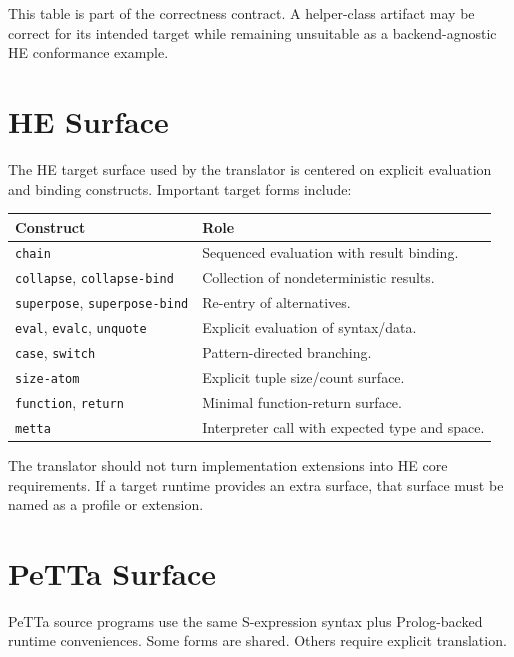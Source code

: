\documentclass[11pt]{article}
\newcommand{\code}[1]{\texttt{#1}}
\newcommand{\HE}{\textup{HE}}
\newcommand{\PeTTa}{\textup{PeTTa}}
\begin{document}
This table is part of the correctness contract.  A helper-class artifact may be
correct for its intended target while remaining unsuitable as a backend-agnostic
\HE{} conformance example.

\section{\HE{} Surface}

The \HE{} target surface used by the translator is centered on explicit
evaluation and binding constructs.  Important target forms include:
\begin{center}
\begin{tabular}{ll}
\toprule
Construct & Role \\
\midrule
\code{chain} & Sequenced evaluation with result binding. \\
\code{collapse}, \code{collapse-bind} & Collection of nondeterministic results. \\
\code{superpose}, \code{superpose-bind} & Re-entry of alternatives. \\
\code{eval}, \code{evalc}, \code{unquote} & Explicit evaluation of syntax/data. \\
\code{case}, \code{switch} & Pattern-directed branching. \\
\code{size-atom} & Explicit tuple size/count surface. \\
\code{function}, \code{return} & Minimal function-return surface. \\
\code{metta} & Interpreter call with expected type and space. \\
\bottomrule
\end{tabular}
\end{center}

The translator should not turn implementation extensions into \HE{} core
requirements.  If a target runtime provides an extra surface, that surface must
be named as a profile or extension.

\section{\PeTTa{} Surface}

\PeTTa{} source programs use the same S-expression syntax plus Prolog-backed
runtime conveniences.  Some forms are shared.  Others require explicit
translation.
\end{document}
